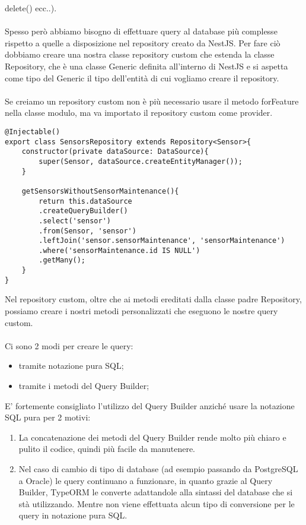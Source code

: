 delete() ecc..).
\\\\
Spesso però abbiamo bisogno di effettuare query al database più complesse rispetto a quelle a disposizione nel repository
creato da NestJS. Per fare ciò dobbiamo creare una nostra classe repository custom che estenda la classe Repository, che è una
classe Generic definita all'interno di NestJS e si aspetta come tipo del Generic il tipo dell'entità di cui vogliamo 
creare il repository.
\\\\
Se creiamo un repository custom non è più necessario usare il metodo forFeature nella classe modulo, ma va importato il repository custom
come provider.
\\ 

\begin{lstlisting}
@Injectable()
export class SensorsRepository extends Repository<Sensor>{
    constructor(private dataSource: DataSource){
        super(Sensor, dataSource.createEntityManager());
    }

    getSensorsWithoutSensorMaintenance(){
        return this.dataSource
        .createQueryBuilder()
        .select('sensor')
        .from(Sensor, 'sensor')
        .leftJoin('sensor.sensorMaintenance', 'sensorMaintenance')
        .where('sensorMaintenance.id IS NULL')
        .getMany();
    }
}
\end{lstlisting}
\leavevmode\newline
Nel repository custom, oltre che ai metodi ereditati dalla classe padre Repository, possiamo creare i nostri metodi personalizzati
che eseguono le nostre query custom. 
\\\\
Ci sono 2 modi per creare le query:
\begin{itemize}
    \item tramite notazione pura SQL;
    \item tramite i metodi del Query Builder;
\end{itemize}
\leavevmode\newline
E' fortemente consigliato l'utilizzo del Query Builder anziché usare la notazione SQL pura per 2 motivi:
\begin{enumerate}
    \item La concatenazione dei metodi del Query Builder rende molto più chiaro e pulito il codice, quindi più facile
        da manutenere.
    \item Nel caso di cambio di tipo di database (ad esempio passando da PostgreSQL a Oracle) le query continuano a funzionare, in 
        quanto grazie al Query Builder,
        TypeORM le converte adattandole alla sintassi del database che si stà utilizzando. Mentre non viene 
        effettuata alcun tipo di conversione per le query in notazione pura SQL.
\end{enumerate}
